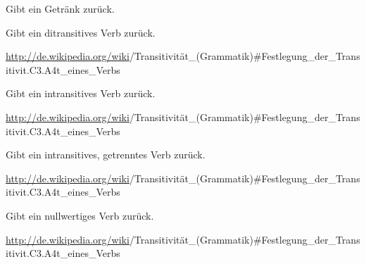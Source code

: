 \documentclass[a4paper,12pt,oneside]{sphinxmanual}
\begin{document}

\begin{fulllineitems}
\label{funktionen:pyzufall.trinken}
Gibt ein Getränk zurück.

\end{fulllineitems}


\begin{fulllineitems}
\label{funktionen:pyzufall.verbd}
Gibt ein ditransitives Verb zurück.

\href{http://de.wikipedia.org/wiki}{http://de.wikipedia.org/wiki}/Transitivität\_(Grammatik)\#Festlegung\_der\_Transitivit.C3.A4t\_eines\_Verbs

\end{fulllineitems}


\begin{fulllineitems}
\label{funktionen:pyzufall.verbi}
Gibt ein intransitives Verb zurück.

\href{http://de.wikipedia.org/wiki}{http://de.wikipedia.org/wiki}/Transitivität\_(Grammatik)\#Festlegung\_der\_Transitivit.C3.A4t\_eines\_Verbs

\end{fulllineitems}


\begin{fulllineitems}
\label{funktionen:pyzufall.verbi2}
Gibt ein intransitives, getrenntes Verb zurück.

\href{http://de.wikipedia.org/wiki}{http://de.wikipedia.org/wiki}/Transitivität\_(Grammatik)\#Festlegung\_der\_Transitivit.C3.A4t\_eines\_Verbs

\end{fulllineitems}


\begin{fulllineitems}
\label{funktionen:pyzufall.verbn}
Gibt ein nullwertiges Verb zurück.

\href{http://de.wikipedia.org/wiki}{http://de.wikipedia.org/wiki}/Transitivität\_(Grammatik)\#Festlegung\_der\_Transitivit.C3.A4t\_eines\_Verbs

\end{fulllineitems}
\end{document}
